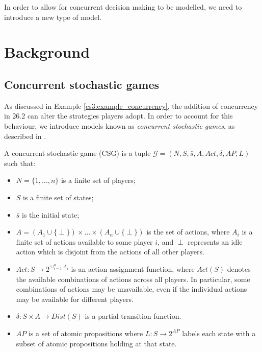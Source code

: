 In order to allow for concurrent decision making to be modelled, we need to introduce a new type of model.

\section{Background}

\subsection{Concurrent stochastic games}

As discussed in Example \ref{cs3:example_concurrency}, the addition of concurrency in 26.2 can alter the strategies players adopt. In order to account for this behaviour, we introduce models known as \emph{concurrent stochastic games}, as described in \cite{kwiatkowska_automated_2018}.

\begin{definition}
    \label{cs3:def_csgs}

    A concurrent stochastic game (CSG) is a tuple $\mathcal{G} = (N, S, \bar{s}, A, Act, \delta, AP, L)$ such that:

    \begin{itemize}
        \item $N = \{ 1, \dots, n \} $ is a finite set of players;
        \item $S$ is a finite set of states;
        \item $\bar{s}$ is the initial state;
        \item $A = \left(A_1 \cup \{\perp\} \right) \times \dots \times \left(A_n \cup \{\perp \} \right)$ is the set of actions, where $A_i$ is a finite set of actions available to some player $i$, and $\perp$ represents an idle action which is disjoint from the actions of all other players.
        \item $Act: S \rightarrow 2^{\cup_{i=1}^{n} A_{i}}$ is an action assignment function, where $Act(S)$ denotes the available combinations of actions across all players. In particular, some combinations of actions may be unavailable, even if the individual actions may be available for different players.
        \item $\delta : S \times A \rightarrow Dist(S)$ is a partial transition function.
        \item $AP$ is a set of atomic propositions where $L : S \rightarrow 2^{AP}$ labels each state with a subset of atomic propositions holding at that state.
    \end{itemize}
\end{definition}

